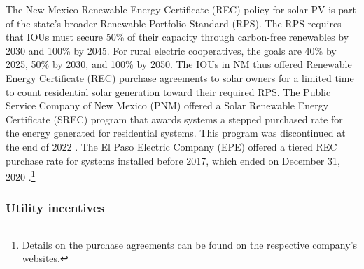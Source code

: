 \documentclass[12pt,twoside,letterpaper]{article}
\begin{document}
The New Mexico Renewable Energy Certificate (REC) policy for solar PV is part of the state's broader Renewable Portfolio Standard (RPS). The RPS requires that IOUs must secure 50\% of their capacity through carbon-free renewables by 2030 and 100\% by 2045. For rural electric cooperatives, the goals are 40\% by 2025, 50\% by 2030, and 100\% by 2050. The IOUs in NM thus offered Renewable Energy Certificate (REC) purchase agreements to solar owners for a limited time to count residential solar generation toward their required RPS. The Public Service Company of New Mexico (PNM) offered a Solar Renewable Energy Certificate (SREC) program that awards systems a stepped purchased rate for the energy generated for residential systems. This program was discontinued at the end of 2022 \parencite{pnmrec}. The El Paso Electric Company (EPE) offered a tiered REC purchase rate for systems installed before 2017, which ended on December 31, 2020 \parencite{eperec, eperecmid}.\footnote{Details on the purchase agreements can be found on the respective company's websites.}

\subsubsection{Utility incentives}
\end{document}
